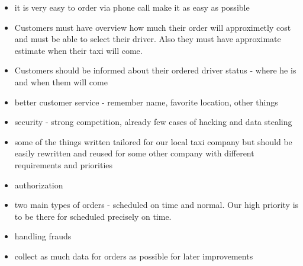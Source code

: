 \begin{itemize}
	\item  it is very easy to order via phone call make it as easy as possible
	\item Customers must have overview how much their order will approximetly cost and must be able to select their driver. Also they must have approximate estimate when their taxi will come.
	\item Customers should be informed about their ordered driver status - where he is and when them will come
	\item better customer service - remember name, favorite location, other things
	\item security - strong competition, already few cases of hacking and data stealing
	\item some of the things written tailored for our local taxi company but should be easily rewritten and reused for some other company with different requirements and priorities
	\item authorization
	\item two main types of orders - scheduled on time and normal. Our high priority is to be there for scheduled precisely on time.
	\item handling frauds
	\item collect as much data for orders as possible for later improvements
\end{itemize}